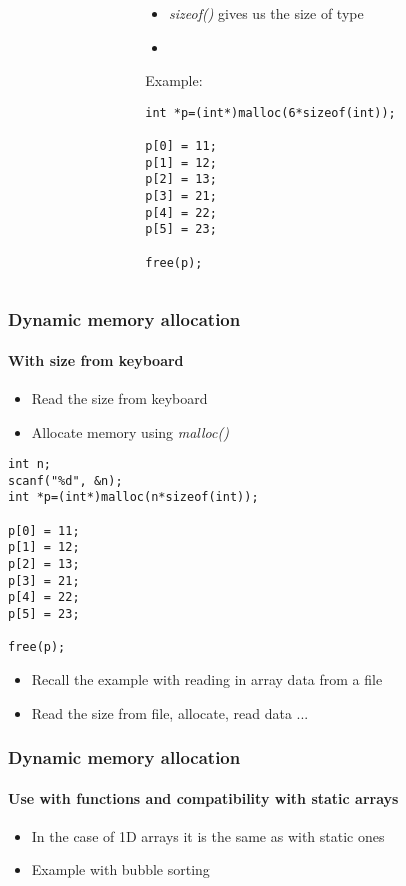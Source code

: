 \documentclass[10pt]{beamer}
\begin{document}
\begin{frame}[fragile]
\begin{columns}
\begin{column}{0.65\textwidth}
    \end{column}
    \begin{column}{0.55\textwidth}
      \begin{itemize}
        \item \textit{sizeof()} gives us the size of type
        \item 
      \end{itemize}
Example:
\begin{lstlisting}
int *p=(int*)malloc(6*sizeof(int));

p[0] = 11;
p[1] = 12;
p[2] = 13;
p[3] = 21;
p[4] = 22;
p[5] = 23;

free(p);
\end{lstlisting}

    \end{column}
  \end{columns}
\end{frame}

\begin{frame}[fragile]
  \frametitle{Dynamic memory allocation}
  \framesubtitle{With size from keyboard}
      \begin{itemize}
        \item Read the size from keyboard
        \item Allocate memory using \textit{malloc()}
      \end{itemize}

\begin{lstlisting}
int n;
scanf("%d", &n);
int *p=(int*)malloc(n*sizeof(int));

p[0] = 11;
p[1] = 12;
p[2] = 13;
p[3] = 21;
p[4] = 22;
p[5] = 23;

free(p);
\end{lstlisting}

      \begin{itemize}
        \item Recall the example with reading in array data from a file
        \item Read the size from file, allocate, read data ...
      \end{itemize}

\end{frame}

\begin{frame}[fragile]
  \frametitle{Dynamic memory allocation}
  \framesubtitle{Use with functions and compatibility with static arrays}
      \begin{itemize}
        \item In the case of 1D arrays it is the same as with static ones
        \item Example with bubble sorting
      \end{itemize}

\end{frame}
\end{document}
